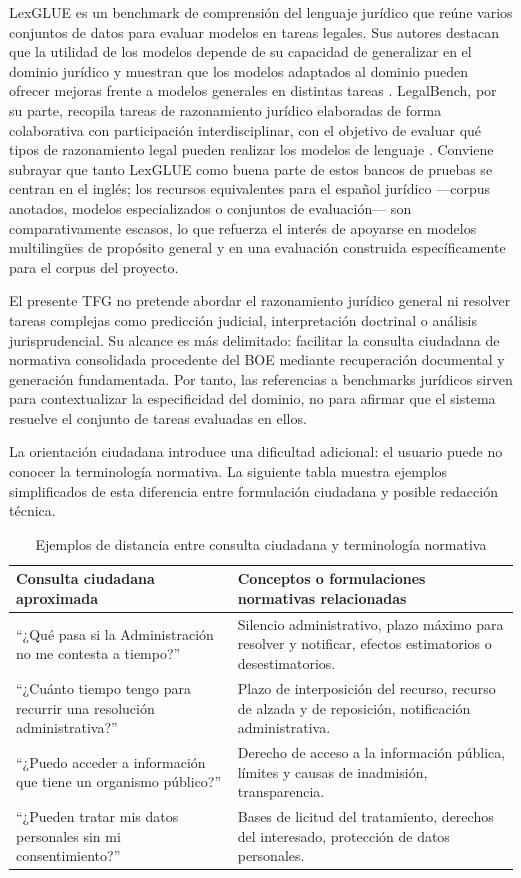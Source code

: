 LexGLUE es un benchmark de comprensión del lenguaje jurídico que reúne varios conjuntos de datos para evaluar modelos en tareas legales. Sus autores destacan que la utilidad de los modelos depende de su capacidad de generalizar en el dominio jurídico y muestran que los modelos adaptados al dominio pueden ofrecer mejoras frente a modelos generales en distintas tareas \cite{chalkidis2022lexglue}. LegalBench, por su parte, recopila tareas de razonamiento jurídico elaboradas de forma colaborativa con participación interdisciplinar, con el objetivo de evaluar qué tipos de razonamiento legal pueden realizar los modelos de lenguaje \cite{guha2023legalbench}. Conviene subrayar que tanto LexGLUE como buena parte de estos bancos de pruebas se centran en el inglés; los recursos equivalentes para el español jurídico —corpus anotados, modelos especializados o conjuntos de evaluación— son comparativamente escasos, lo que refuerza el interés de apoyarse en modelos multilingües de propósito general y en una evaluación construida específicamente para el corpus del proyecto.

El presente TFG no pretende abordar el razonamiento jurídico general ni resolver tareas complejas como predicción judicial, interpretación doctrinal o análisis jurisprudencial. Su alcance es más delimitado: facilitar la consulta ciudadana de normativa consolidada procedente del BOE mediante recuperación documental y generación fundamentada. Por tanto, las referencias a benchmarks jurídicos sirven para contextualizar la especificidad del dominio, no para afirmar que el sistema resuelve el conjunto de tareas evaluadas en ellos.

La orientación ciudadana introduce una dificultad adicional: el usuario puede no conocer la terminología normativa. La siguiente tabla muestra ejemplos simplificados de esta diferencia entre formulación ciudadana y posible redacción técnica.

\begin{table}[htbp]
\centering
\caption{Ejemplos de distancia entre consulta ciudadana y terminología normativa}
\label{tab:consulta-ciudadana-terminologia}
\begin{tabular}{p{}p{}}
\hline
\textbf{Consulta ciudadana aproximada} & \textbf{Conceptos o formulaciones normativas relacionadas} \\
\hline
``¿Qué pasa si la Administración no me contesta a tiempo?'' & Silencio administrativo, plazo máximo para resolver y notificar, efectos estimatorios o desestimatorios. \\
``¿Cuánto tiempo tengo para recurrir una resolución administrativa?'' & Plazo de interposición del recurso, recurso de alzada y de reposición, notificación administrativa. \\
``¿Puedo acceder a información que tiene un organismo público?'' & Derecho de acceso a la información pública, límites y causas de inadmisión, transparencia. \\
``¿Pueden tratar mis datos personales sin mi consentimiento?'' & Bases de licitud del tratamiento, derechos del interesado, protección de datos personales. \\
\hline
\end{tabular}
\end{table}

